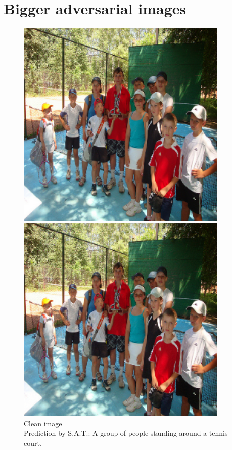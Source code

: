 \section{Bigger adversarial images} \label{appendix:fast_noise_examples}
\begin{figure}[ht]
    \centering
    \begin{minipage}{0.45\textwidth}
        \centering
        \includegraphics[width=0.9\textwidth]{figures/fast_method_group_of_people/group_of_people_0.000.png} %
        \caption*{Clean image\\Prediction by S.A.T.: A group of people standing around a tennis court.}
    \end{minipage}\hfill
    \begin{minipage}{0.45\textwidth}
        \centering
        \includegraphics[width=0.9\textwidth]{figures/fast_method_group_of_people/group_of_people_0.005.png} %

\end{minipage}
\end{figure}

